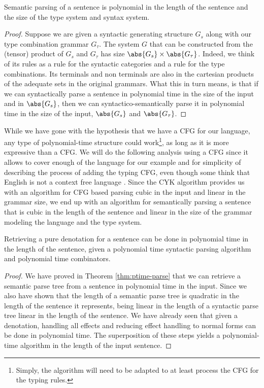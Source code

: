 \begin{thm}
	\label{thm:ptime-parse}
	Semantic parsing of a sentence is polynomial in the length of the	sentence
	and the size of the type system and syntax system.
\end{thm}
\begin{proof}
	Suppose we are given a syntactic generating structure $G_{s}$ along with our
	type combination grammar $G_{\tau}$.
	The system $G$ that can be constructed from the (tensor) product of $G_{s}$ and
	$G_{\tau}$ has size $\abs{G_{s}}\times \abs{G_{\tau}}$.
	Indeed, we think of its rules as a rule for the syntactic categories and a rule
	for the type combinations. Its terminals and non terminals are also in the
	cartesian products of the adequate sets in the original grammars.
	What this in turn means, is that if we can syntactically parse a sentence in
	polynomial time in the size of the input and in $\abs{G_{s}}$, then we can
	syntactico-semantically parse it in polynomial time in the size of the input,
	$\abs{G_{s}}$ and $\abs{G_{\tau}}$.
\end{proof}

While we have gone with the hypothesis that we have a CFG for our language,
any type of polynomial-time structure could work\footnote{Simply, the algorithm
	will need to be	adapted to at least process the CFG for the typing rules.},
as long as it is more expressive than a CFG.
We will do the following analysis using a CFG since it allows to cover enough of
the language for our example and for simplicity of describing the process of
adding the typing CFG, even though some think that English is not a context
free language \cite{higginbothamEnglishNotContextFree1984}.
Since the CYK algorithm provides us with an algorithm for CFG based parsing
cubic in the input and linear in the grammar size, we end up with an algorithm
for semantically parsing a sentence that is cubic in the length of the sentence
and linear in the size of the grammar modeling the language and the type system.

\begin{thm}
	\label{thm:ptime-denot}
	Retrieving a pure denotation for a sentence can be done in polynomial time in
	the length of the sentence, given a polynomial time syntactic parsing
	algorithm and polynomial time combinators.
\end{thm}
\begin{proof}
	We have proved in Theorem \ref{thm:ptime-parse} that we can retrieve a
	semantic parse tree from a	sentence in polynomial time in the input.
	Since we also have shown that the length of a semantic parse tree is quadratic
	in the length of the sentence it represents, being linear in the length of a
	syntactic parse tree linear in the length of the sentence.
	We have already seen that given a denotation, handling all effects and
	reducing effect handling to normal forms can be done in polynomial time.
	The superposition of these steps yields a polynomial-time algorithm in the
	length of the input sentence.
\end{proof}

